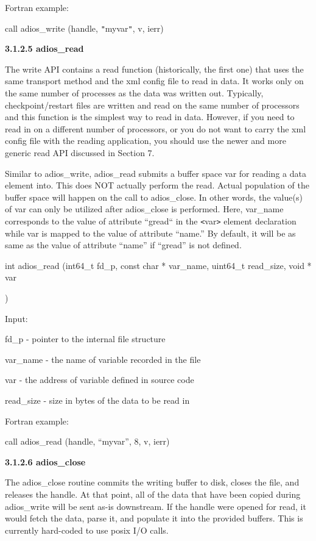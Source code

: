 \leftskip=22pt
Fortran example: 

call adios\_write (handle, \texttt{"}myvar\texttt{"}, v, ierr)\label{HRef119484357}

\leftskip=0pt
\textbf{3.1.2.5 adios\_read}

The write API contains a read function (historically, the first one) that uses 
the same transport method and the xml config file to read in data. It works only 
on the same number of processes as the data was written out. Typically, checkpoint/restart 
files are written and read on the same number of processors and this function is 
the simplest way to read in data. However, if you need to read in on a different 
number of processors, or you do not want to carry the xml config file with the 
reading application, you should use the newer and more generic read API discussed 
in Section 7.

Similar to adios\_write, {\color{color01} adios\_read submits a buffer space var 
for reading a data element into. This does NOT actually perform the read. Actual 
population of the buffer space will happen on the call to adios\_close. In other 
words, the value(s) of var can only be utilized after adios\_close is performed. 
Here, }var\_name corresponds to the value of attribute ``gread`` in the \texttt{<}var\texttt{>} 
element declaration while var is mapped to the value of attribute ``name.'' By 
default, it will be as same as the value of attribute ``name'' if ``gread'' is 
not defined.

\leftskip=103pt
\parindent=-81pt
int adios\_read (int64\_t fd\_p, const char * var\_name, uint64\_t  read\_size, 
void * var

)

\leftskip=22pt
\parindent=0pt
Input:

fd\_p - pointer to the internal file structure

var\_name - the name of variable recorded in the file

var - the address of variable defined in source code

read\_size -  size in bytes of the data to be read in 

\leftskip=22pt
Fortran example: 

\parindent=18pt
call adios\_read (handle, ``myvar'', 8, v, ierr)

\leftskip=0pt
\parindent=0pt
\textbf{3.1.2.6 adios\_close}

The adios\_close routine {\color{color01} commits the writing buffer to disk, closes 
the file, and releases the handle. At that point, all of the data that have been 
copied during adios\_write will be sent as-is downstream. If the handle were opened 
for read, it would fetch the data, parse it, and populate it into the provided 
buffers. This is currently hard-coded to use posix I/O calls.}

